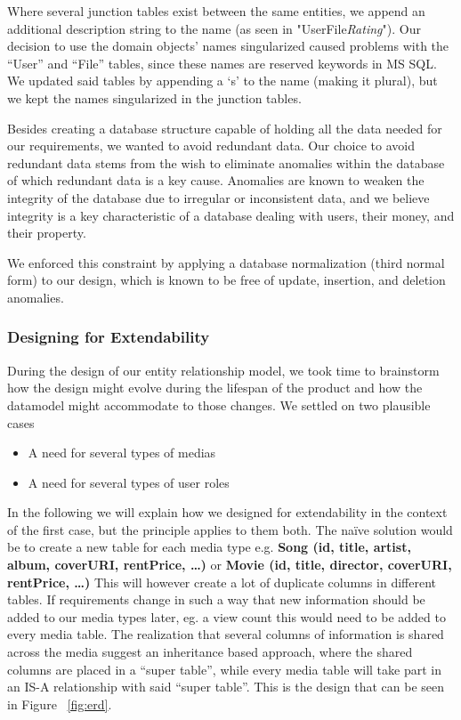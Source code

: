 Where several junction tables exist between the same entities, we append an additional description string to the name (as seen in "UserFile\textit{Rating}").
Our decision to use the domain objects' names singularized caused problems with the “User” and “File” tables, since these names are reserved keywords in MS SQL. We updated said tables by appending a ‘s’ to the name (making it plural), but we kept the names singularized in the junction tables.

Besides creating a database structure capable of holding all the data needed for our requirements, we wanted to avoid redundant data. Our choice to avoid redundant data stems from the wish to eliminate anomalies within the database of which redundant data is a key cause. Anomalies are known to weaken the integrity of the database\cite{dbbook} due to irregular or inconsistent data, and we believe integrity is a key characteristic of a database dealing with users, their money, and their property.

We enforced this constraint by applying a database normalization (third normal form) to our design, which is known to be free of update, insertion, and deletion anomalies.

\subsubsection{Designing for Extendability}
\label{sec:extendability}
During the design of our entity relationship model, we took time to brainstorm how the design might evolve during the lifespan of the product and how the datamodel might accommodate to those changes. We settled on two plausible cases
\begin{itemize}
\item A need for several types of medias
\item A need for several types of user roles
\end{itemize}
In the following we will explain how we designed for extendability in the context of the first case, but the principle applies to them both.
The naïve solution would be to create a new table for each media type e.g. 
\textbf{Song (id, title, artist, album, coverURI, rentPrice, …)} or
\textbf{Movie (id, title, director, coverURI, rentPrice, …)}
This will however create a lot of duplicate columns in different tables. If requirements change in such a way that new information should be added to our media types later, eg. a view count this would need to be added to every media table.
The realization that several columns of information is shared across the media suggest an inheritance based approach, where the shared columns are placed in a “super table”, while every media table will take part in an IS-A relationship with said “super table”. This is the design that can be seen in Figure ~\ref{fig:erd}.

